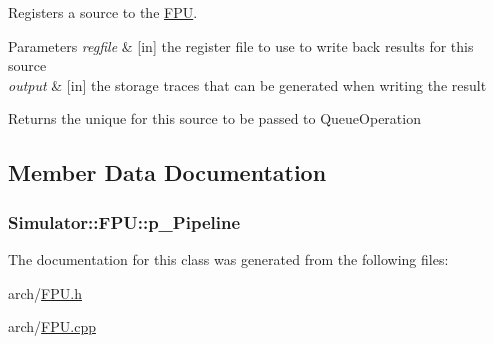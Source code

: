 Registers a source to the \hyperlink{class_simulator_1_1_f_p_u}{F\+P\+U}. 


\begin{DoxyParams}{Parameters}
{\em regfile} & \mbox{[}in\mbox{]} the register file to use to write back results for this source \\
\hline
{\em output} & \mbox{[}in\mbox{]} the storage traces that can be generated when writing the result \\
\hline
\end{DoxyParams}
\begin{DoxyReturn}{Returns}
the unique for this source to be passed to Queue\+Operation 
\end{DoxyReturn}


\subsection{Member Data Documentation}
\hypertarget{class_simulator_1_1_f_p_u_a696de79c0d8e304961d3378a821ebb35}{
\subsubsection[{p\+\_\+\+Pipeline}]{ Simulator\+::\+F\+P\+U\+::p\+\_\+\+Pipeline}}\label{class_simulator_1_1_f_p_u_a696de79c0d8e304961d3378a821ebb35}


The documentation for this class was generated from the following files\+:\begin{DoxyCompactItemize}
\item 
arch/\hyperlink{_f_p_u_8h}{F\+P\+U.\+h}\item 
arch/\hyperlink{_f_p_u_8cpp}{F\+P\+U.\+cpp}\end{DoxyCompactItemize}
